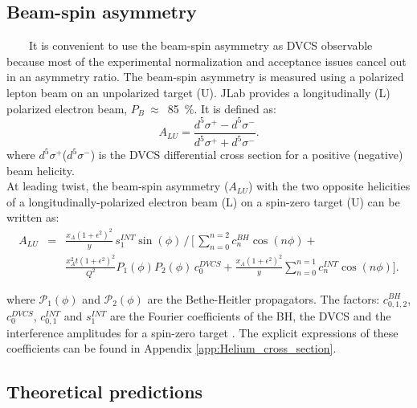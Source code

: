 \subsection{Beam-spin asymmetry}
~~~~It is convenient to use the beam-spin asymmetry as DVCS observable because most of the experimental normalization and acceptance issues cancel out in an asymmetry ratio. The beam-spin asymmetry is measured using a polarized lepton beam on an unpolarized target (U). JLab provides a longitudinally (L) polarized electron beam, $P_{B}~\approx$~85~$\%$. It is defined as:
  \begin{equation}
  A_{LU} = \frac{d^{5}\sigma^{+} - d^{5}\sigma^{-} }
                {d^{5}\sigma^{+} + d^{5}\sigma^{-}}.
    \label{BSA_equation}
  \end{equation}
  where $d^{5}\sigma^{+}$($d^{5}\sigma^{-}$) is the DVCS differential cross section for a positive (negative) beam helicity.\\

 At leading twist, the beam-spin asymmetry ($A_{LU}$) with the  two opposite helicities of a  longitudinally-polarized electron beam (L) on a spin-zero target (U) can be written as:        
\begin{eqnarray}
A_{LU}& =& \frac{x_A(1+\epsilon^2)^2}{y} \, s_1^{INT} \sin(\phi) \, 
\bigg/ \, \bigg[ \, \sum_{n=0}^{n=2}c_n^{BH}\cos{(n\phi)} +  \\
& & \frac{x_A^2 t {(1+\epsilon^2)}^2}{Q^2} P_1(\phi) P_2(\phi) \, c_0^{DVCS} + 
\frac{x_A (1+\epsilon^2)^2}{y} \sum_{n=0}^{n=1} c_n^{INT} \cos{(n\phi)} \bigg].  \nonumber 
\label{eq:coh_BSA}
\end{eqnarray}

where $\mathcal{P}_1(\phi)$ and $\mathcal {P}_2(\phi)$ are the Bethe-Heitler 
propagators. The factors: $c_{0,1,2}^{BH}$, $c_0^{DVCS}$, $c_{0,1}^{INT}$ and 
$s_1^{INT}$ are the Fourier coefficients of the BH, the DVCS and the 
interference amplitudes for a spin-zero target \cite{Kir}. The explicit 
expressions of these coefficients can be found in Appendix 
\ref{app:Helium_cross_section}.\\


\subsection{Theoretical predictions} \label{Theoretical_hypotheses}
